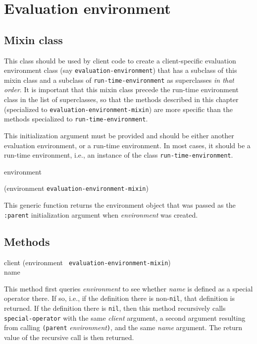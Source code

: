 \chapter{Evaluation environment}

\section{Mixin class}


This class should be used by client code to create a client-specific
evaluation environment class (say \texttt{evaluation-environment})
that has a subclass of this mixin class and a subclass of
\texttt{run-time-environment} as superclasses \emph{in that order}.
It is important that this mixin class precede the run-time environment
class in the list of superclasses, so that the methods described in
this chapter (specialized to \texttt{evaluation-environment-mixin})
are more specific than the methods specialized to
\texttt{run-time-environment}.


This initialization argument must be provided and should be either
another evaluation environment, or a run-time environment.  In most
cases, it should be a run-time environment, i.e., an instance of the
class \texttt{run-time-environment}.

 {environment}

 {(environment {\tt evaluation-environment-mixin})}

This generic function returns the environment object that was passed
as the \texttt{:parent} initialization argument when
\textit{environment} was created.

\section{Methods}

{\small{} {client (environment {\tt
      evaluation-environment-mixin}) \\ name}
}

This method first queries \textit{environment} to see whether
\textit{name} is defined as a special operator there.  If so, i.e., if
the definition there is non-\texttt{nil}, that definition is returned.
If the definition there is \texttt{nil}, then this method recursively
calls \texttt{special-operator} with the same \textit{client}
argument, a second argument resulting from calling \texttt{(parent}
\textit{environment}\texttt{)}, and the same \textit{name} argument.
The return value of the recursive call is then returned.


